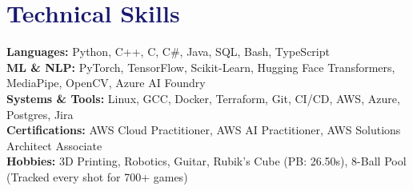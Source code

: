 \documentclass[letterpaper,11pt]{article}
\newcommand\accentColor{MidnightBlue}
\begin{document}
\section{\textcolor{\accentColor}{Technical Skills}}
\begin{itemize}[leftmargin=0.15in, label={}]
  \small{\item{
        \textbf{Languages: }{Python, C++, C, C\#,  Java, SQL, Bash, TypeScript} \\
        \textbf{ML \& NLP: }{PyTorch, TensorFlow, Scikit-Learn, Hugging Face Transformers, MediaPipe, OpenCV, Azure AI Foundry} \\
        \textbf{Systems \& Tools: }{Linux, GCC, Docker, Terraform, Git, CI/CD, AWS, Azure, Postgres, Jira} \\
        \textbf{Certifications: }{AWS Cloud Practitioner, AWS AI Practitioner, AWS Solutions Architect Associate} \\
        \textbf{Hobbies: }{3D Printing, Robotics, Guitar, Rubik's Cube (PB: 26.50s), 8-Ball Pool (Tracked every shot for 700+ games)}
        }}
\end{itemize}
\vspace{-10pt}
\end{document}
